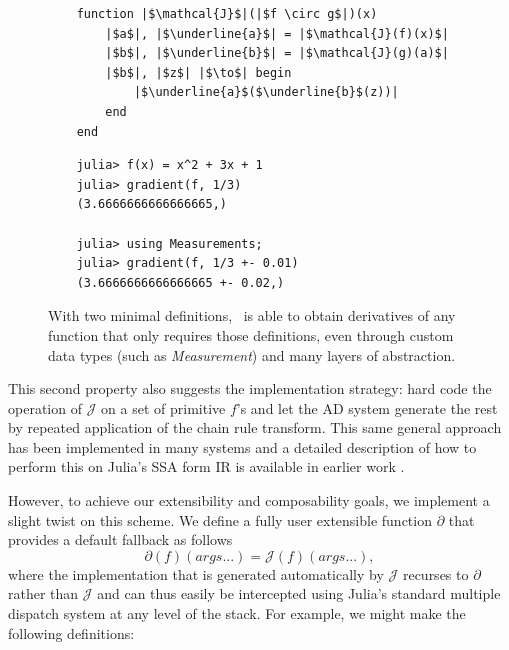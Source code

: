 \documentclass{juliacon}
\newcommand{\Zygote}{\iftoggle{anonymous}{$\partial$P.jl}{Zygote}}
\begin{document}
\begin{figure}
    \begin{minipage}{0.5\textwidth}
    \begin{verbatim}
    function |$\mathcal{J}$|(|$f \circ g$|)(x)
        |$a$|, |$\underline{a}$| = |$\mathcal{J}(f)(x)$|
        |$b$|, |$\underline{b}$| = |$\mathcal{J}(g)(a)$|
        |$b$|, |$z$| |$\to$| begin
            |$\underline{a}$($\underline{b}$(z))|
        end
    end
    \end{verbatim}
    \caption{The differential operator $\mathcal{J}$ is able to implement the chain rule through a local, syntactic recursive transformation.}\label{chain}
    \end{minipage}
    \hspace{0.1in}
    \begin{minipage}{0.5\textwidth}
    \begin{verbatim}
    julia> f(x) = x^2 + 3x + 1
    julia> gradient(f, 1/3)
    (3.6666666666666665,)
    
    julia> using Measurements;
    julia> gradient(f, 1/3 +- 0.01)
    (3.6666666666666665 +- 0.02,)
    \end{verbatim}
    \caption{With two minimal definitions, \Zygote\ is able to obtain derivatives of any function that only requires those definitions, even through custom data types (such as \textit{Measurement}) and many layers of abstraction.}\label{generalize}
    \end{minipage}
\end{figure}

    This second property also suggests the implementation strategy: hard code the operation of $\mathcal{J}$ on a set of primitive $f$'s and let the AD system generate the rest by repeated application of the chain rule transform. This same general approach has been implemented in many systems \cite{pearlmutter2008reverse,wang2018demystifying} and a  detailed description of how to perform this on Julia's SSA form IR is available in earlier work \cite{Zygote.jl-2018}.

    However, to achieve our extensibility and composability goals, we implement a slight twist on this scheme. We define a fully user extensible function $\partial$ that provides a default fallback as follows
\[
\partial(f)(args...) = \mathcal{J}(f)(args...),
\]
    where the implementation that is generated automatically by $\mathcal{J}$ recurses to $\partial$ rather than $\mathcal{J}$ and can thus easily be intercepted using Julia's standard multiple dispatch system at any level of the stack. For example, we might make the following definitions:
\end{document}
